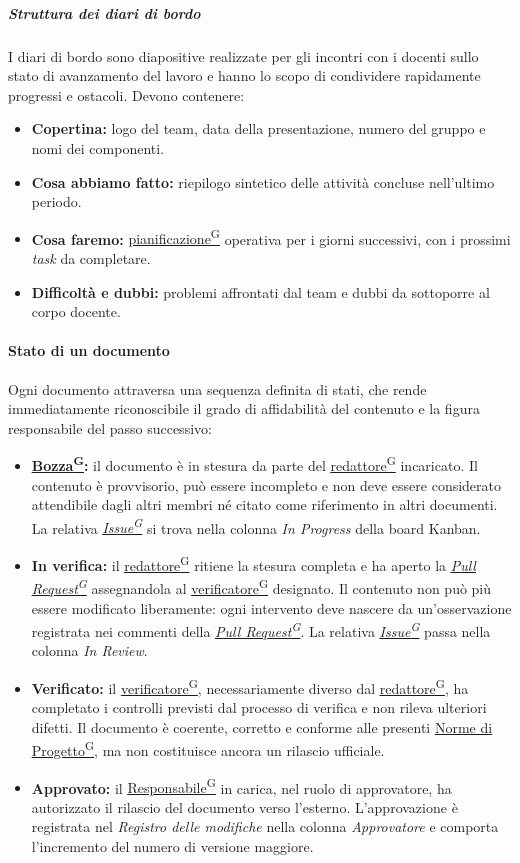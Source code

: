 \documentclass[a4paper,12pt]{article}
\providecommand{\glslink}[2]{\href{https://alittlebyte-19.github.io/Documentazione/glossario.html\#gls-#1}{\underline{#2}\textsuperscript{\scriptsize G}}}
\begin{document}
\subparagraph{Struttura dei diari di bordo}
I diari di bordo sono diapositive realizzate per gli incontri con i docenti sullo stato di avanzamento del lavoro e hanno lo scopo di condividere rapidamente progressi e ostacoli. Devono contenere:
\begin{itemize}
    \item \textbf{Copertina:} logo del team, data della presentazione, numero del gruppo e nomi dei componenti.
    \item \textbf{Cosa abbiamo fatto:} riepilogo sintetico delle attività concluse nell'ultimo periodo.
    \item \textbf{Cosa faremo:} \glslink{pianificazione}{pianificazione} operativa per i giorni successivi, con i prossimi \textit{task} da completare.
    \item \textbf{Difficoltà e dubbi:} problemi affrontati dal team e dubbi da sottoporre al corpo docente.
\end{itemize}

\paragraph{Stato di un documento}\label{sec:stato-documento}
Ogni documento attraversa una sequenza definita di stati, che rende immediatamente riconoscibile il grado di affidabilità del contenuto e la figura responsabile del passo successivo:

\begin{itemize}
    \item \textbf{\glslink{bozza-draft}{Bozza}:} il documento è in stesura da parte del \glslink{redattore}{redattore} incaricato. Il contenuto è provvisorio, può essere incompleto e non deve essere considerato attendibile dagli altri membri né citato come riferimento in altri documenti. La relativa \textit{\glslink{issue}{Issue}} si trova nella colonna \textit{In Progress} della board Kanban.
    \item \textbf{In verifica:} il \glslink{redattore}{redattore} ritiene la stesura completa e ha aperto la \textit{\glslink{pull-request}{Pull Request}} assegnandola al \glslink{verificatore}{verificatore} designato. Il contenuto non può più essere modificato liberamente: ogni intervento deve nascere da un'osservazione registrata nei commenti della \textit{\glslink{pull-request}{Pull Request}}. La relativa \textit{\glslink{issue}{Issue}} passa nella colonna \textit{In Review}.
    \item \textbf{Verificato:} il \glslink{verificatore}{verificatore}, necessariamente diverso dal \glslink{redattore}{redattore}, ha completato i controlli previsti dal processo di verifica e non rileva ulteriori difetti. Il documento è coerente, corretto e conforme alle presenti \glslink{norme-di-progetto}{Norme di Progetto}, ma non costituisce ancora un rilascio ufficiale.
    \item \textbf{Approvato:} il \glslink{responsabile}{Responsabile} in carica, nel ruolo di approvatore, ha autorizzato il rilascio del documento verso l'esterno. L'approvazione è registrata nel \textit{Registro delle modifiche} nella colonna \textit{Approvatore} e comporta l'incremento del numero di versione maggiore.
\end{itemize}
\end{document}
